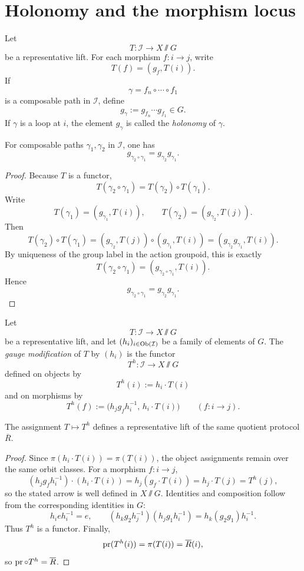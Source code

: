 \section{Holonomy and the morphism locus}
\begin{definition}
	Let
	\[
		T:\mathcal I\to X\sslash G
	\]
	be a representative lift.  For each morphism \(f:i\to j\), write
	\[
		T(f)=(g_f,T(i)).
	\]
	If
	\[
		\gamma=f_n\circ\cdots\circ f_1
	\]
	is a composable path in \(\mathcal I\), define
	\[
		g_\gamma:=g_{f_n}\cdots g_{f_1}\in G.
	\]
	If \(\gamma\) is a loop at \(i\), the element \(g_\gamma\) is called
	the \emph{holonomy} of \(\gamma\).
\end{definition}
\begin{lemma}
	For composable paths \(\gamma_1,\gamma_2\) in \(\mathcal I\), one has
	\[
		g_{\gamma_2\circ\gamma_1}=g_{\gamma_2}g_{\gamma_1}.
	\]
\end{lemma}
\begin{proof}
	Because \(T\) is a functor,
	\[
		T(\gamma_2\circ\gamma_1)=T(\gamma_2)\circ T(\gamma_1).
	\]
	Write
	\[
		T(\gamma_1)=(g_{\gamma_1},T(i)),
		\qquad
		T(\gamma_2)=(g_{\gamma_2},T(j)).
	\]
	Then
	\[
		T(\gamma_2)\circ T(\gamma_1)
		=
		(g_{\gamma_2},T(j))\circ(g_{\gamma_1},T(i))
		=
		(g_{\gamma_2}g_{\gamma_1},T(i)).
	\]
	By uniqueness of the group label in the action groupoid, this is
	exactly
	\[
		T(\gamma_2\circ\gamma_1)=(g_{\gamma_2\circ\gamma_1},T(i)).
	\]
	Hence
	\[
		g_{\gamma_2\circ\gamma_1}=g_{\gamma_2}g_{\gamma_1}.
	\]
\end{proof}
\begin{definition}
	\label{def:locus-gauge-modification}
	Let
	\[
		T:\mathcal I\to X\sslash G
	\]
	be a representative lift, and let \((h_i)_{i\in\operatorname{Ob}(\mathcal I)}\) be a
	family of elements of \(G\).  The \emph{gauge modification} of \(T\) by
	\((h_i)\) is the functor
	\[
		T^h:\mathcal I\to X\sslash G
	\]
	defined on objects by
	\[
		T^h(i):=h_i\cdot T(i)
	\]
	and on morphisms by
	\[
		T^h(f):=\bigl(h_j g_f h_i^{-1},\, h_i\cdot T(i)\bigr)
		\qquad
		(f:i\to j).
	\]
\end{definition}
\begin{lemma}
	The assignment \(T\mapsto T^h\) defines a representative lift of the
	same quotient protocol \(\overline R\).
\end{lemma}
\begin{proof}
	Since \(\pi(h_i\cdot T(i))=\pi(T(i))\), the object assignments remain
	over the same orbit classes.  For a morphism \(f:i\to j\),
	\[
		(h_j g_f h_i^{-1})\cdot (h_i\cdot T(i))
		=
		h_j(g_f\cdot T(i))
		=
		h_j\cdot T(j)
		=
		T^h(j),
	\]
	so the stated arrow is well defined in \(X\sslash G\).  Identities and
	composition follow from the corresponding identities in \(G\):
	\[
		h_i e h_i^{-1}=e,
		\qquad
		(h_k g_2 h_j^{-1})(h_j g_1 h_i^{-1})=h_k(g_2g_1)h_i^{-1}.
	\]
	Thus \(T^h\) is a functor.  Finally,
	\[
		\operatorname{pr}(T^h(i))=\pi(T(i))=\overline R(i),
	\]
	so \(\operatorname{pr}\circ T^h=\overline R\).
\end{proof}
